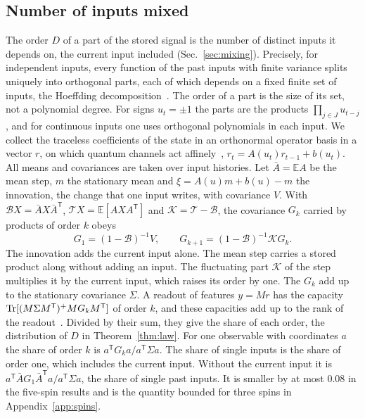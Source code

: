 \subsection{Number of inputs mixed}
\label{sec:order}
The order $D$ of a part of the stored signal is the number of distinct inputs it depends on, the current input
included (Sec.~\ref{sec:mixing}).
Precisely, for independent inputs, every function of the past inputs with finite variance splits uniquely into orthogonal parts, each of which
depends on a fixed finite set of inputs, the Hoeffding decomposition~\cite{Hoeffding1948}. The order of a part is the
size of its set, not a polynomial degree. For signs
$u_t=\pm1$ the parts are the products $\prod_{j\in J}u_{t-j}$, and for continuous inputs one uses orthogonal
polynomials in each input. We collect the traceless
coefficients of the state in an orthonormal operator basis in a vector $r$, on which quantum channels act
affinely~\cite{MartinezPenaOrtega2023,MartinezPenaOrtega2025}, $r_t=A(u_t)r_{t-1}+b(u_t)$. All means and covariances
are taken over input histories. Let $\bar A=\mathbb EA$
be the mean step, $m$ the stationary mean and $\xi=A(u)m+b(u)-m$ the innovation, the change that one input writes,
with covariance $V$. With $\mathcal BX=\bar AX\bar A^{\mathsf T}$, $\mathcal TX=\mathbb E[AXA^{\mathsf T}]$ and
$\mathcal K=\mathcal T-\mathcal B$, the covariance $G_k$ carried by products of order $k$ obeys
\begin{equation}
  G_1=(1-\mathcal B)^{-1}V,\qquad G_{k+1}=(1-\mathcal B)^{-1}\mathcal KG_k .
  \label{eq:recursion}
\end{equation}
The innovation adds the current input alone. The mean step carries a stored product along without adding an input. The
fluctuating part $\mathcal K$ of the step multiplies it by the current input, which raises its order by one. The $G_k$
add up to the stationary covariance $\Sigma$. A readout of features $y=Mr$ has the capacity
$\operatorname{Tr}[(M\Sigma M^{\mathsf T})^+MG_kM^{\mathsf T}]$ of order $k$, and these capacities add up to the rank of the
readout~\cite{Dambre2012}. Divided by their sum, they give the share of each order, the distribution of $D$ in
Theorem~\ref{thm:law}. For one observable with coordinates $a$ the share of order $k$ is
$a^{\mathsf T}G_ka/a^{\mathsf T}\Sigma a$. The share of single inputs is the share of order one, which includes the
current input. Without the current input it is $a^{\mathsf T}\bar AG_1\bar A^{\mathsf T}a/a^{\mathsf T}\Sigma a$, the
share of single past inputs. It is smaller by at most 0.08 in the five-spin results and is the quantity bounded for
three spins in Appendix~\ref{app:spins}.


